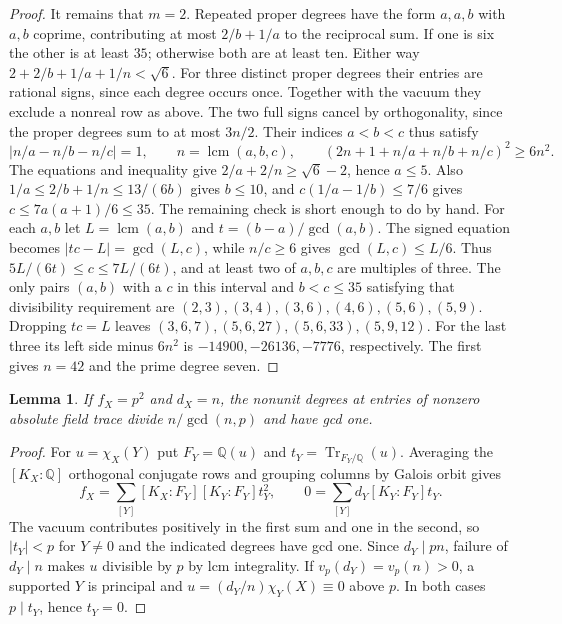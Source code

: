 \documentclass[11pt]{amsart}
\numberwithin{equation}{section}
\newtheorem{lemma}[theorem]{Lemma}
\DeclareMathOperator{\lcm}{lcm}
\DeclareMathOperator{\Tr}{Tr}
\newcommand{\QQ}{\mathbb Q}
\begin{document}
\begin{proof}
It remains that $m=2$. Repeated proper degrees have the form $a,a,b$
with $a,b$ coprime, contributing at most $2/b+1/a$ to the reciprocal
sum. If one is six the other is at least $35$; otherwise both are at
least ten. Either way $2+2/b+1/a+1/n<\sqrt6$. For three distinct
proper degrees their entries are rational signs, since each degree
occurs once. Together with the vacuum they exclude a nonreal row as above.
The two full signs cancel by orthogonality, since the proper degrees
sum to at most $3n/2$. Their indices $a<b<c$ thus satisfy
\[
 |n/a-n/b-n/c|=1,\qquad n=\lcm(a,b,c),\qquad
 (2n+1+n/a+n/b+n/c)^2\ge6n^2 .
\]
The equations and inequality give $2/a+2/n\ge\sqrt6-2$, hence $a\le5$.
Also $1/a\le2/b+1/n\le13/(6b)$ gives $b\le10$, and
$c(1/a-1/b)\le7/6$ gives $c\le7a(a+1)/6\le35$.
The remaining check is short enough to do by hand. For each $a,b$ let
$L=\lcm(a,b)$ and $t=(b-a)/\gcd(a,b)$. The signed equation becomes
$|tc-L|=\gcd(L,c)$, while $n/c\ge6$ gives $\gcd(L,c)\le L/6$.
Thus $5L/(6t)\le c\le7L/(6t)$, and at least two of $a,b,c$ are
multiples of three. The only pairs $(a,b)$ with a $c$ in this interval
and $b<c\le35$ satisfying that divisibility requirement are
$(2,3),(3,4),(3,6),(4,6),(5,6),(5,9)$. Dropping $tc=L$ leaves
$(3,6,7),(5,6,27),(5,6,33),(5,9,12)$. For the last three its left side minus
$6n^2$ is $-14900,-26136,-7776$, respectively. The first gives $n=42$
and the prime degree seven.
\end{proof}

\begin{lemma}\label{prime-square}
If $f_X=p^2$ and $d_X=n$, the nonunit degrees at entries of nonzero
absolute field trace divide $n/\gcd(n,p)$ and have gcd one.
\end{lemma}
\begin{proof}
For $u=\chi_X(Y)$ put $F_Y=\QQ(u)$ and $t_Y=\Tr_{F_Y/\QQ}(u)$.
Averaging the $[K_X:\QQ]$ orthogonal conjugate rows and grouping
columns by Galois orbit gives
\[
 f_X=\sum_{[Y]}[K_X:F_Y][K_Y:F_Y]t_Y^2,\qquad
 0=\sum_{[Y]}d_Y[K_Y:F_Y]t_Y.
\]
The vacuum contributes positively in the first sum and one in the
second, so $|t_Y|<p$ for $Y\ne0$ and the indicated degrees have gcd one.
Since $d_Y\mid pn$, failure of $d_Y\mid n$ makes $u$ divisible by $p$
by lcm integrality. If $v_p(d_Y)=v_p(n)>0$, a supported $Y$ is
principal and $u=(d_Y/n)\chi_Y(X)\equiv0$ above $p$. In both cases
$p\mid t_Y$, hence $t_Y=0$.
\end{proof}
\end{document}
